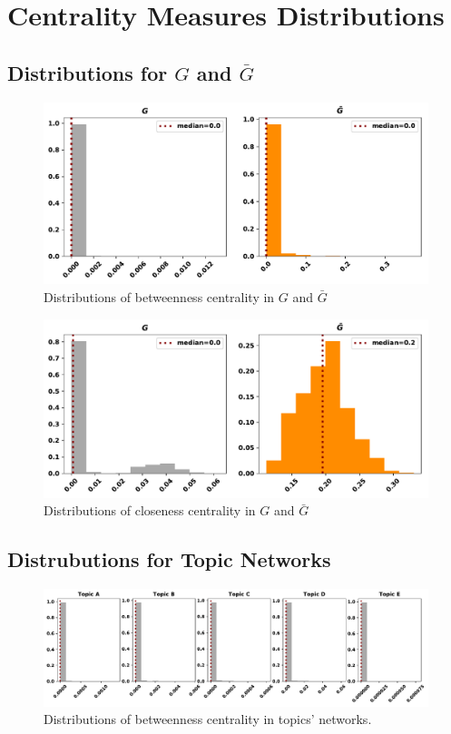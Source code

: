 \documentclass{article}
\theoremstyle{definition}
\begin{document}
\section{Centrality Measures Distributions}

\subsection{Distributions for \(G\) and \(\bar{G}\)}

\begin{figure}[!hbtp]
    \centering
    \includegraphics[width=.8\textwidth]{pd_betweeness_centralities.pdf}
    \caption{Distributions of betweenness centrality in \(G\) and \(\bar{G}\)}
    \label{fig:bc_distributions}
\end{figure}

\begin{figure}[!hbtp]
    \centering
    \includegraphics[width=.8\textwidth]{pd_closeness_centralities.pdf}
    \caption{Distributions of closeness centrality in \(G\) and \(\bar{G}\)}
    \label{fig:cc_distributions}
\end{figure}

\subsection{Distrubutions for Topic Networks}\label{appendix:distributions}

\begin{figure}[!hbtp]
    \centering
    \includegraphics[width=\textwidth]{topics_betweeness_distributions.pdf}
    \caption{Distributions of betweenness centrality in topics' networks.}
    \label{fig:bc_distributions_topics}
\end{figure}
\end{document}
